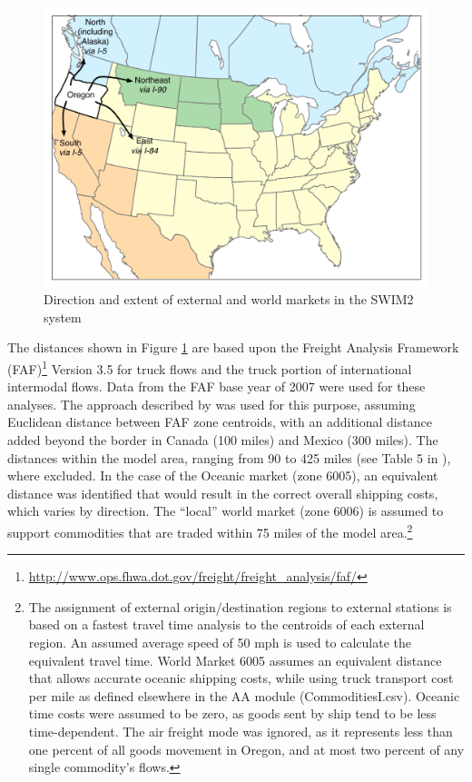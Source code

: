 \begin{figure}   %
\centering
\includegraphics[width=5in]{overview/oregonregions}
\caption{Direction and extent of external and world markets in the SWIM2 system}
\label{fig:world-markets}
\end{figure}

The distances shown in Figure \ref{fig:world-markets} are based upon the Freight Analysis Framework (FAF)\footnote{\url{http://www.ops.fhwa.dot.gov/freight/freight_analysis/faf/}} Version 3.5 for truck flows and the truck portion of international intermodal flows. Data from the FAF base year of 2007 were used for these analyses. The approach described by \cite{moeckel10} was used for this purpose, assuming Euclidean distance between FAF zone centroids, with an additional distance added beyond the border in Canada (100 miles) and Mexico (300 miles). The distances within the model area, ranging from 90 to 425 miles (see Table 5 in \cite{moeckel10}), where excluded. In the case of the Oceanic market (zone 6005), an equivalent distance was identified that would result in the correct overall shipping costs, which varies by direction. The ``local'' world market (zone 6006) is assumed to support commodities that are traded within 75 miles of the model area.\footnote{The assignment of external origin/destination regions to external stations is based on a fastest travel time analysis to the centroids of each external region. An assumed average speed of 50 mph is used to calculate the equivalent travel time. World Market 6005 assumes an equivalent distance that allows accurate oceanic shipping costs, while using truck transport cost per mile as defined elsewhere in the AA module (CommoditiesI.csv). Oceanic time costs were assumed to be zero, as goods sent by ship tend to be less time-dependent. The air freight mode was ignored, as it represents less than one percent of all goods movement in Oregon, and at most two percent of any single commodity's flows.}

